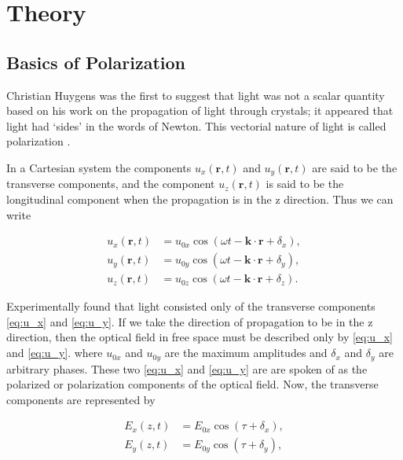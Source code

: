 \section{Theory}


\subsection{Basics of Polarization}
Christian Huygens was the first to suggest that light was not a scalar quantity based on his work on the propagation of light through crystals; it appeared that light had `sides' in the words of Newton. This vectorial nature of light is called polarization \cite{Goldstein2003PolarizedLight}.

In a Cartesian system the components $u_x(\mathbf{r},t)$ and $u_y(\mathbf{r},t)$ are said to be the transverse components, and the component $u_z(\mathbf{r},t)$  is said to be the longitudinal component when the propagation is in the z direction. Thus we can write

\begin{subequations}
\begin{align}
u_x(\mathbf{r},t) &= u_{0x}\cos(\omega t - \mathbf{k}\cdot\mathbf{r} + \delta_x), \label{eq:u_x}\\
u_y(\mathbf{r},t) &= u_{0y}\cos(\omega t - \mathbf{k}\cdot\mathbf{r} + \delta_y), \label{eq:u_y}\\
u_z(\mathbf{r},t) &= u_{0z}\cos(\omega t - \mathbf{k}\cdot\mathbf{r} + \delta_z). \label{eq:u_z}
\end{align}
\end{subequations}

Experimentally found that light consisted only of the transverse components \cref{eq:u_x} and \cref{eq:u_y}. If we take the direction of propagation to be in the z direction, then the optical field in free space must be described only by \cref{eq:u_x} and \cref{eq:u_y}. where $u_{0x}$ and $u_{0y}$ are the maximum amplitudes and $\delta_x$ and $\delta_y$ are arbitrary phases. These two \cref{eq:u_x} and \cref{eq:u_y} are are spoken of as the polarized or polarization components of the optical field. Now, the transverse components are represented by

\begin{subequations}\label{eq:E_trans}
\begin{align}
E_x(z,t) &= E_{0x}\cos(\tau+\delta_x), \label{eq:E_x}\\
E_y(z,t) &= E_{0y}\cos(\tau+\delta_y), \label{eq:E_y}
\end{align}
\end{subequations}

